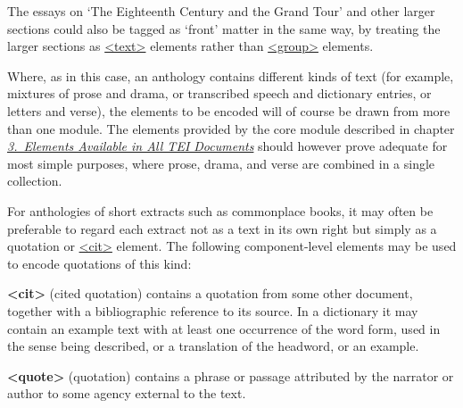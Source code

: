 The essays on ‘The Eighteenth Century and the Grand Tour’ and other larger sections could also be tagged as ‘front’ matter in the same way, by treating the larger sections as \hyperref[TEI.text]{<text>} elements rather than \hyperref[TEI.group]{<group>} elements.\par
Where, as in this case, an anthology contains different kinds of text (for example, mixtures of prose and drama, or transcribed speech and dictionary entries, or letters and verse), the elements to be encoded will of course be drawn from more than one module. The elements provided by the core module described in chapter \textit{\hyperref[CO]{3.\ Elements Available in All TEI Documents}} should however prove adequate for most simple purposes, where prose, drama, and verse are combined in a single collection.\par
For anthologies of short extracts such as commonplace books, it may often be preferable to regard each extract not as a text in its own right but simply as a quotation or \hyperref[TEI.cit]{<cit>} element. The following component-level elements may be used to encode quotations of this kind: 
\begin{sansreflist}
  
\item [\textbf{<cit>}] (cited quotation) contains a quotation from some other document, together with a bibliographic reference to its source. In a dictionary it may contain an example text with at least one occurrence of the word form, used in the sense being described, or a translation of the headword, or an example.
\item [\textbf{<quote>}] (quotation) contains a phrase or passage attributed by the narrator or author to some agency external to the text.
\end{sansreflist}
